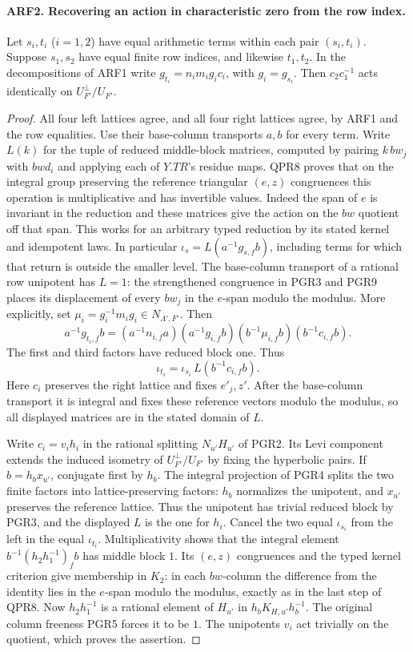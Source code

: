 \paragraph{ARF2. Recovering an action in characteristic zero from the row index.}
Let $s_i,t_i$ ($i=1,2$) have equal arithmetic terms within each
pair $(s_i,t_i)$. Suppose $s_1,s_2$ have equal finite row indices,
and likewise $t_1,t_2$. In the decompositions of ARF1 write
$g_{t_i}=n_i m_i g_i c_i$, with $g_i=g_{s_i}$. Then
$c_2c_1^{-1}$ acts identically on $U_{F'}^\perp/U_{F'}$.
\begin{proof}
All four left lattices agree, and all four right lattices agree,
by ARF1 and the row equalities. Use their base-column transports
$a,b$ for every term. Write $L(k)$ for the tuple of reduced
middle-block matrices, computed by pairing $k\,bw_j$ with $bwd_i$
and applying each of $Y.TR$'s residue maps. QPR8 proves that on
the integral group preserving the reference triangular $(e,z)$
congruences this operation is multiplicative and has invertible
values. Indeed the span of $e$ is invariant in the reduction and
these matrices give the action on the $bw$ quotient off that span.
This works for an arbitrary typed reduction by its stated kernel
and idempotent laws. In particular $\iota_s=L(a^{-1}g_{s,f}b)$,
including terms for which that return is outside the smaller level.
The base-column transport of a rational row unipotent has $L=1$:
the strengthened congruence in PGR3 and PGR9 places its displacement
of every $bw_j$ in the $e$-span modulo the modulus. More explicitly, set
$\mu_i=g_i^{-1}m_i g_i\in N_{\Lambda',F'}$. Then
\[
 a^{-1}g_{t_i,f}b=(a^{-1}n_{i,f}a)(a^{-1}g_{i,f}b)
                        (b^{-1}\mu_{i,f}b)(b^{-1}c_{i,f}b).
\]
The first and third factors have reduced block one. Thus
\[
               \iota_{t_i}=\iota_{s_i}\,L(b^{-1}c_{i,f} b).
\]
Here $c_i$ preserves the right lattice and fixes $e'_j,z'$.
After the base-column transport it is integral and fixes these
reference vectors modulo the modulus, so all displayed matrices
are in the stated domain of $L$.

Write $c_i=v_i h_i$ in the rational splitting $N_{u'}H_{u'}$
of PGR2. Its Levi component extends the induced isometry of
$U_{F'}^\perp/U_{F'}$ by fixing the hyperbolic pairs. If
$b=h_b x_{u'}$, conjugate first by $h_b$. The integral projection
of PGR4 splits the two finite factors into lattice-preserving
factors: $h_b$ normalizes the unipotent, and $x_{u'}$ preserves
the reference lattice. Thus the unipotent has trivial reduced
block by PGR3, and the displayed $L$ is the one for $h_i$.
Cancel the two equal $\iota_{s_i}$ from the left in the equal
$\iota_{t_i}$. Multiplicativity shows that the integral element
$b^{-1}(h_2h_1^{-1})_f b$ has middle block $1$. Its $(e,z)$
congruences and the typed kernel criterion give membership in
$K_2$: in each $bw$-column the difference from the identity lies
in the $e$-span modulo the modulus, exactly as in the last step
of QPR8. Now $h_2h_1^{-1}$ is a rational element of $H_{u'}$
in $h_b K_{H,u'} h_b^{-1}$. The original column freeness PGR5
forces it to be $1$. The unipotents $v_i$ act trivially on the
quotient, which proves the assertion.
\end{proof}


